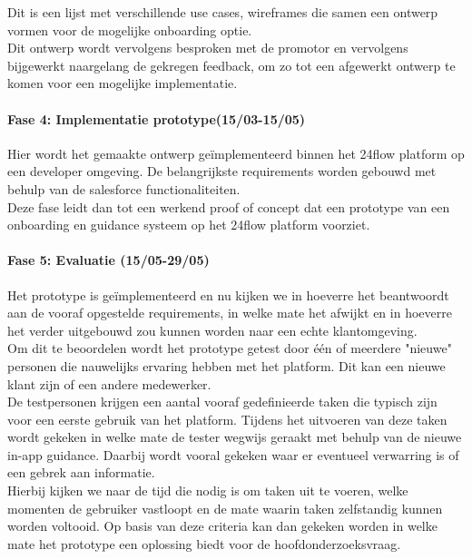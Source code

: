 Dit is een lijst met verschillende use cases, wireframes die samen een ontwerp vormen voor de mogelijke onboarding optie. 
\\

Dit ontwerp wordt vervolgens besproken met de promotor en vervolgens bijgewerkt naargelang de gekregen feedback, om zo tot een afgewerkt ontwerp te komen voor een mogelijke implementatie.

\paragraph{Fase 4: Implementatie prototype(15/03-15/05)}
Hier wordt het gemaakte ontwerp geïmplementeerd binnen het 24flow platform op een developer omgeving. De belangrijkste requirements worden gebouwd met behulp van de salesforce functionaliteiten.
\\

Deze fase leidt dan tot een werkend proof of concept dat een prototype van een onboarding en guidance systeem op het 24flow platform voorziet.
\paragraph{Fase 5: Evaluatie (15/05-29/05)}
Het prototype is geïmplementeerd en nu kijken we in hoeverre het beantwoordt aan de vooraf opgestelde requirements, in welke mate het afwijkt en in hoeverre het verder uitgebouwd zou kunnen worden naar een echte klantomgeving.
\\

Om dit te beoordelen wordt het prototype getest door één of meer\textbf{}dere "nieuwe"  personen die nauwelijks ervaring hebben met het platform. Dit kan een nieuwe klant zijn of een andere medewerker.
\\

De testpersonen krijgen een aantal vooraf gedefinieerde taken die typisch zijn voor een eerste gebruik van het platform. Tijdens het uitvoeren van deze taken wordt gekeken in welke mate de tester wegwijs geraakt met behulp van de nieuwe in-app guidance. Daarbij wordt vooral gekeken waar er eventueel verwarring is of een gebrek aan informatie.
\\

Hierbij kijken we naar de tijd die nodig is om taken uit te voeren, welke momenten de gebruiker vastloopt en de mate waarin taken zelfstandig kunnen worden voltooid. Op basis van deze criteria kan dan gekeken worden in welke mate het prototype een oplossing biedt voor de hoofdonderzoeksvraag.
\\


